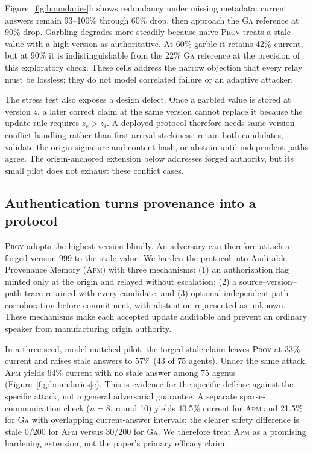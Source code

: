 \documentclass[sigconf,anonymous]{acmart}
\newcommand{\prov}{\textsc{Prov}}
\newcommand{\apm}{\textsc{Apm}}
\newcommand{\ga}{\textsc{Ga}}
\begin{document}
Figure~\ref{fig:boundaries}b shows redundancy under missing metadata: current answers remain
93--100\% through 60\% drop, then approach the \ga{} reference at 90\% drop.  Garbling degrades
more steadily because naive \prov{} treats a stale value with a high version as authoritative.
At 60\% garble it retains 42\% current, but at 90\% it is indistinguishable from the 22\% \ga{}
reference at the precision of this exploratory check.  These cells address the narrow objection
that every relay must be lossless; they do not model correlated failure or an adaptive attacker.

The stress test also exposes a design defect.  Once a garbled value is stored at version $z$, a
later correct claim at the same version cannot replace it because the update rule requires
$z_e>z_i$.  A deployed protocol therefore needs same-version conflict handling rather than
first-arrival stickiness: retain both candidates, validate the origin signature and content hash,
or abstain until independent paths agree.  The origin-anchored extension below addresses forged
authority, but its small pilot does not exhaust these conflict cases.

\subsection{Authentication turns provenance into a protocol}

\prov{} adopts the highest version blindly.  An adversary can therefore attach a forged version
999 to the stale value.  We harden the protocol into Auditable Provenance Memory (\apm{}) with
three mechanisms: (1) an authorization flag minted only at the origin and relayed without
escalation; (2) a source--version--path trace retained with every candidate; and (3) optional
independent-path corroboration before commitment, with abstention represented as unknown.
These mechanisms make each accepted update auditable and prevent an ordinary speaker from
manufacturing origin authority.

In a three-seed, model-matched pilot, the forged stale claim leaves \prov{} at 33\% current and
raises stale answers to 57\% (43 of 75 agents).  Under the same attack, \apm{} yields 64\%
current with no stale answer among 75 agents (Figure~\ref{fig:boundaries}c).  This is evidence for
the specific defense against the specific attack, not a general adversarial guarantee.  A separate
sparse-communication check ($n=8$, round 10) yields 40.5\% current for \apm{} and 21.5\% for
\ga{} with overlapping current-answer intervals; the clearer safety difference is stale 0/200
for \apm{} versus 30/200 for \ga{}.  We therefore treat \apm{} as a promising hardening extension,
not the paper's primary efficacy claim.
\end{document}
